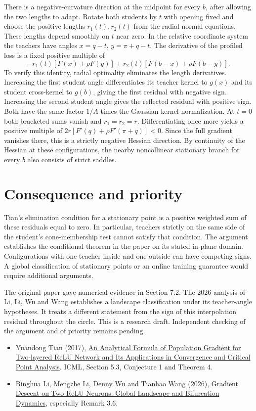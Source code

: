 \documentclass[11pt]{article}
\begin{document}
There is a negative-curvature direction at the midpoint for every $b$, after allowing the two lengths to adapt. Rotate both students by $t$ with opening fixed and choose the positive lengths $r_1(t),r_2(t)$ from the radial normal equations. These lengths depend smoothly on $t$ near zero. In the relative coordinate system the teachers have angles $x=q-t$, $y=\pi+q-t$. The derivative of the profiled loss is a fixed positive multiple of
\[
 -r_1(t)[F(x)+\rho F(y)]+r_2(t)[F(b-x)+\rho F(b-y)] .
\]
To verify this identity, radial optimality eliminates the length derivatives. Increasing the first student angle differentiates its teacher kernel to $g(x)$ and its student cross-kernel to $g(b)$, giving the first residual with negative sign. Increasing the second student angle gives the reflected residual with positive sign. Both have the same factor $1/A$ times the Gaussian kernel normalization. At $t=0$ both bracketed sums vanish and $r_1=r_2=r$. Differentiating once more yields a positive multiple of $2r[F'(q)+\rho F'(\pi+q)]<0$. Since the full gradient vanishes there, this is a strictly negative Hessian direction. By continuity of the Hessian at these configurations, the nearby noncollinear stationary branch for every $b$ also consists of strict saddles.

\section*{Consequence and priority}
Tian's elimination condition for a stationary point is a positive weighted sum of these residuals equal to zero. In particular, teachers strictly on the same side of the student's cone-membership test cannot satisfy that condition. The argument establishes the conditional theorem in the paper on its stated in-plane domain. Configurations with one teacher inside and one outside can have competing signs. A global classification of stationary points or an online training guarantee would require additional arguments.

The original paper gave numerical evidence in Section 7.2. The 2026 analysis of Li, Li, Wu and Wang establishes a landscape classification under its teacher-angle hypotheses. It treats a different statement from the sign of this interpolation residual throughout the circle. This is a research draft. Independent checking of the argument and of priority remains pending.

\begin{itemize}
\item Yuandong Tian (2017), \href{https://proceedings.mlr.press/v70/tian17a.html}{An Analytical Formula of Population Gradient for Two-layered ReLU Network and Its Applications in Convergence and Critical Point Analysis}. ICML, Section 5.3, Conjecture 1 and Theorem 4.
\item Binghua Li, Mengzhe Li, Denny Wu and Tianhao Wang (2026), \href{https://arxiv.org/abs/2610.42118}{Gradient Descent on Two ReLU Neurons: Global Landscape and Bifurcation Dynamics}, especially Remark 3.6.
\end{itemize}
\end{document}
